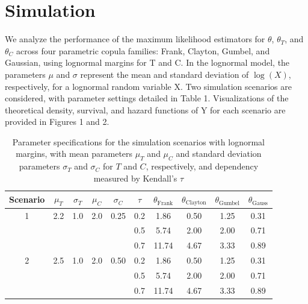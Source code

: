 \section{Simulation}
We analyze the performance of the maximum likelihood estimators for $\theta$, $\theta_T$, and $\theta_C$ across four parametric copula families: Frank, Clayton, Gumbel, and Gaussian, using lognormal margins for T and C. In the lognormal model, the parameters $\mu$ and $\sigma$ represent the mean and standard deviation of $\log(X)$, respectively, for a lognormal random variable X. Two simulation scenarios are considered, with parameter settings detailed in Table 1. Visualizations of the theoretical density, survival, and hazard functions of Y for each scenario are provided in Figures 1 and 2.

\begin{table}[h]
    \centering
    \caption{Parameter specifications for the simulation scenarios with lognormal margins, with mean parameters \( \mu_T \) and \( \mu_C \) and standard deviation parameters \( \sigma_T \) and \( \sigma_C \) for \( T \) and \( C \), respectively, and dependency measured by Kendall’s \( \tau \)}
    \begin{tabular}{|c|c|c|c|c|c|c|c|c|c|}
        \hline
        Scenario & \( \mu_T \) & \( \sigma_T \) & \( \mu_C \) & \( \sigma_C \) & \( \tau \) & \( \theta_{\text{Frank}} \) & \( \theta_{\text{Clayton}} \) & \( \theta_{\text{Gumbel}} \) & \( \theta_{\text{Gauss}} \) \\
        \hline
        1 & 2.2 & 1.0 & 2.0 & 0.25 & 0.2 & 1.86 & 0.50 & 1.25 & 0.31 \\ 
          &     &     &     &      & 0.5 & 5.74 & 2.00 & 2.00 & 0.71 \\ 
          &     &     &     &      & 0.7 & 11.74 & 4.67 & 3.33 & 0.89 \\ 
        \hline
        2 & 2.5 & 1.0 & 2.0 & 0.50 & 0.2 & 1.86 & 0.50 & 1.25 & 0.31 \\ 
          &     &     &     &      & 0.5 & 5.74 & 2.00 & 2.00 & 0.71 \\ 
          &     &     &     &      & 0.7 & 11.74 & 4.67 & 3.33 & 0.89 \\ 
        \hline
    \end{tabular}
    \label{tab:parameter_specifications}
\end{table}

